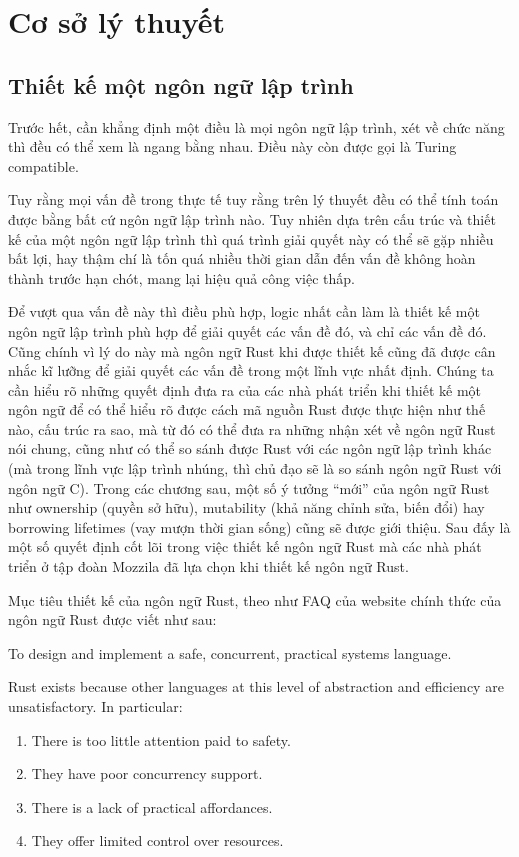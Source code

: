 \chapter{Cơ sở lý thuyết}\label{ch2-top}
\section{Thiết kế một ngôn ngữ lập trình}
Trước hết, cần khẳng định một điều là mọi ngôn ngữ lập trình, xét về chức năng thì đều có thể xem là ngang bằng nhau.
Điều này còn được gọi là Turing compatible.

Tuy rằng mọi vấn đề trong thực tế tuy rằng trên lý thuyết đều có thể tính toán được bằng bất cứ ngôn ngữ lập trình nào.
Tuy nhiên dựa trên cấu trúc và thiết kế của một ngôn ngữ lập trình thì quá trình giải quyết này có thể sẽ gặp nhiều bất lợi, hay thậm chí là tốn quá nhiều thời gian dẫn đến vấn đề không hoàn thành trước hạn chót, mang lại hiệu quả công việc thấp.

Để vượt qua vấn đề này thì điều phù hợp, logic nhất cần làm là thiết kế một ngôn ngữ lập trình phù hợp để giải quyết các vấn đề đó, và chỉ các vấn đề đó.
Cũng chính vì lý do này mà ngôn ngữ Rust khi được thiết kế cũng đã được cân nhắc kĩ lưỡng để giải quyết các vấn đề trong một lĩnh vực nhất định.
Chúng ta cần hiểu rõ những quyết định đưa ra của các nhà phát triển khi thiết kế một ngôn ngữ để có thể hiểu rõ được cách mã nguồn Rust được thực hiện như thế nào, cấu trúc ra sao, mà từ đó có thể đưa ra những nhận xét về ngôn ngữ Rust nói chung, cũng như có thể so sánh được Rust với các ngôn ngữ lập trình khác (mà trong lĩnh vực lập trình nhúng, thì chủ đạo sẽ là so sánh ngôn ngữ Rust với ngôn ngữ C).
Trong các chương sau, một số ý tưởng ``mới'' của ngôn ngữ Rust như ownership (quyền sở hữu), mutability (khả năng chỉnh sửa, biến đổi) hay borrowing lifetimes (vay mượn thời gian sống) cũng sẽ được giới thiệu.
Sau đấy là một số quyết định cốt lõi trong việc thiết kế ngôn ngữ Rust mà các nhà phát triển ở tập đoàn Mozzila đã lựa chọn khi thiết kế ngôn ngữ Rust.

Mục tiêu thiết kế của ngôn ngữ Rust, theo như FAQ của website chính thức của ngôn ngữ Rust được viết như sau:
\bigskip

To design and implement a safe, concurrent, practical systems language.

Rust exists because other languages at this level of abstraction and efficiency are unsatisfactory. In particular:

\begin{enumerate}
\item There is too little attention paid to safety.
\item They have poor concurrency support.
\item There is a lack of practical affordances.
\item They offer limited control over resources.
\end{enumerate}

